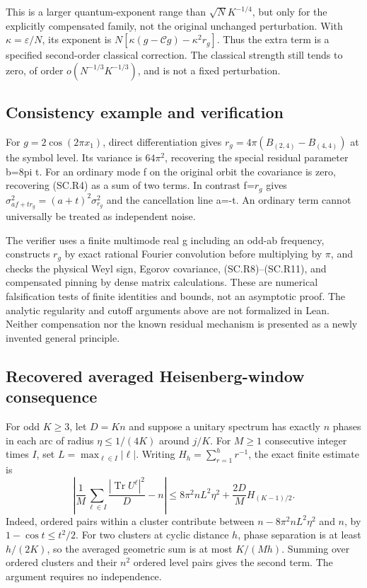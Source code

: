This is a larger quantum-exponent range than \(\sqrt N K^{-1/4}\), but only for the explicitly compensated family, not the original unchanged perturbation. With \(\kappa=\varepsilon/N\), its exponent is \(N[\kappa(g-\mathcal Cg)-\kappa^2r_g]\). Thus the extra term is a specified second-order classical correction. The classical strength still tends to zero, of order \(o(N^{-1/3}K^{-1/3})\), and is not a fixed perturbation.

\subsection{Consistency example and verification}\label{smooth_residual:consistency-example-and-verification}

For \(g=2\cos(2\pi x_1)\), direct differentiation gives \(r_g=4\pi(B_{(2,4)}-B_{(4,4)})\) at the symbol level. Its variance is \(64\pi^2\), recovering the special residual parameter b=8pi t. For an ordinary mode f on the original orbit the covariance is zero, recovering (SC.R4) as a sum of two terms. In contrast f=\(r_{g}\) gives \(\sigma_{af+tr_g}^2=(a+t)^2\sigma_{r_g}^2\) and the cancellation line a=-t. An ordinary term cannot universally be treated as independent noise.

The verifier uses a finite multimode real g including an odd-ab frequency, constructs \(r_{g}\) by exact rational Fourier convolution before multiplying by \(\pi\), and checks the physical Weyl sign, Egorov covariance, (SC.R8)--(SC.R11), and compensated pinning by dense matrix calculations. These are numerical falsification tests of finite identities and bounds, not an asymptotic proof. The analytic regularity and cutoff arguments above are not formalized in Lean. Neither compensation nor the known residual mechanism is presented as a newly invented general principle.


\subsection{Recovered averaged Heisenberg-window consequence}
For odd $K\ge3$, let $D=Kn$ and suppose a unitary spectrum has exactly
$n$ phases in each arc of radius $\eta\le1/(4K)$ around $j/K$.
For $M\ge1$ consecutive integer times $I$, set $L=\max_{\ell\in I}|\ell|$.
Writing $H_h=\sum_{r=1}^h r^{-1}$, the exact finite estimate is
\[
 \left|\frac1M\sum_{\ell\in I}\frac{|\operatorname{Tr}U^\ell|^2}{D}-n\right|
 \le 8\pi^2n L^2\eta^2+\frac{2D}{M}H_{(K-1)/2}.
\]
Indeed, ordered pairs within a cluster contribute between
$n-8\pi^2 nL^2\eta^2$ and $n$, by $1-\cos t\le t^2/2$.
For two clusters at cyclic distance $h$, phase separation is at least
$h/(2K)$, so the averaged geometric sum is at most $K/(Mh)$.
Summing over ordered clusters and their $n^2$ ordered level pairs gives
the second term. The argument requires no independence.

